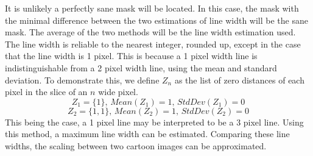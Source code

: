 \documentclass[../main.tex]{subfiles}
\begin{document}
    It is unlikely a perfectly sane mask will be located.
    In this case, the mask with the minimal difference between the two estimations of line width will be the sane mask.
    The average of the two methods will be the line width estimation used.
    The line width is reliable to the nearest integer, rounded up, except in the case that the line width is 1 pixel.
    This is because a 1 pixel width line is indistinguishable from a 2 pixel width line, using the mean and standard deviation.
    To demonstrate this, we define $Z_n$ as the list of zero distances of each pixel in the slice of an $n$ wide pixel.
    \[ Z_1 = \{1\},\,Mean(Z_1) = 1,\, StdDev(Z_1) = 0\]
    \[ Z_2 = \{1,1\},\,Mean(Z_2) = 1,\, StdDev(Z_2) = 0\]
    This being the case, a 1 pixel line may be interpreted to be a 3 pixel line.
    Using this method, a maximum line width can be estimated.
    Comparing these line widths, the scaling between two cartoon images can be approximated.
\end{document}
